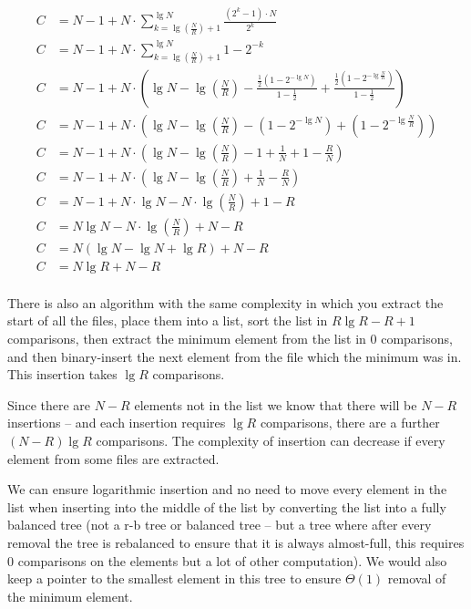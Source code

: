 \documentclass[10pt,\jkfside,a4paper]{article}
\begin{document}
\begin{enumerate}
\begin{equation}
\begin{split}
C &= N - 1 + N \cdot \sum_{k=\lg\left(\frac{N}{R}\right) + 1}^{\lg{N}} \frac{(2^k - 1) \cdot N}{2^k} \\
C &= N - 1 + N \cdot \sum_{k=\lg\left(\frac{N}{R}\right) + 1}^{\lg{N}} 1 - 2^{-k} \\
C &= N - 1 + N \cdot \left(\lg N - \lg\left(\frac{N}{R}\right) - \frac{\frac{1}{2}(1 - 2^{-\lg{N}})}{1 - \frac{1}{2}} + \frac{\frac{1}{2}(1 - 2^{-\lg{\frac{N}{R}}})}{1 - \frac{1}{2}} \right) \\
C &= N - 1 + N \cdot \left(\lg N - \lg\left(\frac{N}{R}\right) - (1 - 2^{-\lg{N}}) + (1 - 2^{-\lg{\frac{N}{R}}})\right) \\
C &= N - 1 + N \cdot \left(\lg N - \lg\left(\frac{N}{R}\right) - 1 + \frac{1}{N} + 1 - \frac{R}{N} \right) \\
C &= N - 1 + N \cdot \left(\lg N - \lg\left(\frac{N}{R}\right) + \frac{1}{N} - \frac{R}{N} \right) \\
C &= N - 1 + N \cdot \lg N - N \cdot \lg\left(\frac{N}{R}\right) + 1 - R\\
C &= N \lg N - N \cdot \lg\left(\frac{N}{R}\right) + N - R \\
C &= N (\lg N - \lg N + \lg R) + N - R \\
C &= N \lg R + N - R \\
\end{split}
\end{equation}

There is also an algorithm with the same complexity in which you extract the start of all the files, 
place them into a list, sort the list in $R\lg R - R + 1$ comparisons, then extract the minimum element 
from the list in 0 comparisons, and then binary-insert the next element from the file which the minimum was in. 
This insertion takes $\lg R$ comparisons.

Since there are $N - R$ elements not in the list we know that there will be $N - R$ insertions -- and 
each insertion requires $\lg R$ comparisons, there are a further $(N - R)\lg R$ comparisons. 
The complexity of insertion can decrease if every element from some files are extracted.

We can ensure logarithmic insertion and no need to move 
every element in the list when inserting into the middle of the list by converting the list into a 
fully balanced tree (not a r-b tree or balanced tree -- but a tree where after every removal the tree is
rebalanced to ensure that it is always almost-full, this requires 0 comparisons on the elements but a lot 
of other computation). We 
would also keep a pointer to the smallest element in this tree to ensure $\Theta(1)$ removal of the minimum element.


\end{enumerate}
\end{document}
